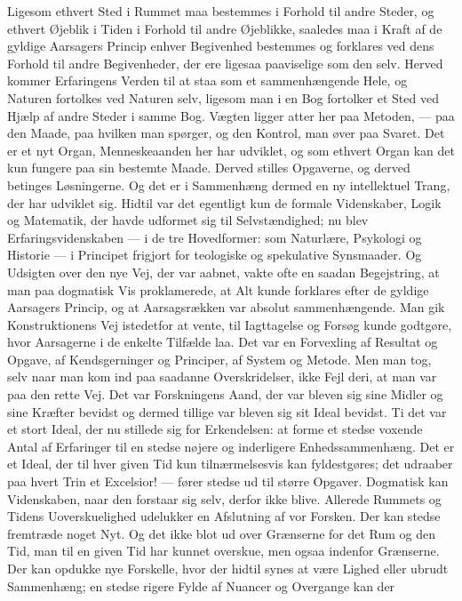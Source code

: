 \documentclass[12pt,a4paper]{article}
\newcommand{\opage}[1]{\marginnote{\footnotesize\textit{[#1]}}}
\begin{document}
Ligesom ethvert Sted i Rummet maa bestemmes i Forhold til andre Steder, og
ethvert Øjeblik i Tiden i Forhold til andre Øjeblikke, saaledes maa i Kraft
af de gyldige Aarsagers Princip enhver Begivenhed bestemmes og forklares ved
dens Forhold til andre Begivenheder, der ere ligesaa paaviselige som den
selv. Herved kommer Erfaringens Verden til at staa som et sammenhængende
Hele, og Naturen fortolkes ved Naturen selv, ligesom man i en Bog fortolker
et Sted ved Hjælp af andre Steder i samme Bog. Vægten ligger atter her paa
Metoden, --- paa den Maade, paa hvilken man spørger, og den Kontrol, man
øver paa Svaret. Det er et nyt Organ, Menneskeaanden her har udviklet, og
som ethvert Organ kan det kun fungere paa sin bestemte Maade. Derved stilles
Opgaverne, og derved betinges Løsningerne. Og det er i Sammenhæng dermed en
ny intellektuel Trang, der har udviklet sig. Hidtil var det egentligt kun de
formale Videnskaber, Logik og Matematik, der havde udformet sig til
Selvstændighed; nu blev Erfaringsvidenskaben --- i de tre Hovedformer: som
Naturlære, Psykologi og Historie --- i Principet frigjort for teologiske og
spekulative Synsmaader. Og Udsigten over den nye Vej, der var aabnet, vakte
ofte en saadan Begejstring, at man paa dogmatisk Vis proklamerede, at Alt
kunde forklares efter de gyldige Aarsagers Princip, og at Aarsagsrækken var
absolut sammenhængende. Man gik Konstruktionens Vej istedetfor at vente, til
Iagttagelse og Forsøg kunde godtgøre, hvor Aarsagerne i de enkelte Tilfælde
laa. Det var en Forvexling af Resultat og Opgave, af Kendsgerninger og
Principer, af System og Metode. Men man tog, selv \opage{19} naar man kom ind paa
saadanne Overskridelser, ikke Fejl deri, at man var paa den rette Vej. Det
var Forskningens Aand, der var bleven sig sine Midler og sine Kræfter
bevidst og dermed tillige var bleven sig sit Ideal bevidst. Ti det var et
stort Ideal, der nu stillede sig for Erkendelsen: at forme et stedse
voxende Antal af Erfaringer til en stedse nøjere og inderligere
Enhedssammenhæng. Det er et Ideal, der til hver given Tid kun
tilnærmelsesvis kan fyldestgøres; det udraaber paa hvert Trin et Excelsior!
--- fører stedse ud til større Opgaver. Dogmatisk kan Videnskaben, naar den
forstaar sig selv, derfor ikke blive. Allerede Rummets og Tidens
Uoverskuelighed udelukker en Afslutning af vor Forsken. Der kan stedse
fremtræde noget Nyt. Og det ikke blot ud over Grænserne for det Rum og den
Tid, man til en given Tid har kunnet overskue, men ogsaa indenfor Grænserne.
Der kan opdukke nye Forskelle, hvor der hidtil synes at være Lighed eller
ubrudt Sammenhæng; en stedse rigere Fylde af Nuancer og Overgange kan der
\end{document}
